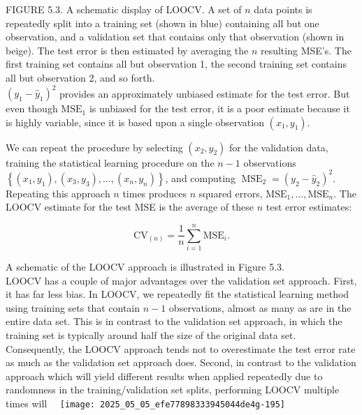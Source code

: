 \documentclass[10pt]{article}
\begin{document}
FIGURE 5.3. A schematic display of LOOCV. A set of $n$ data points is repeatedly split into a training set (shown in blue) containing all but one observation, and a validation set that contains only that observation (shown in beige). The test error is then estimated by averaging the $n$ resulting MSE's. The first training set contains all but observation 1, the second training set contains all but observation 2, and so forth.\\
$\left(y_{1}-\hat{y}_{1}\right)^{2}$ provides an approximately unbiased estimate for the test error. But even though $\mathrm{MSE}_{1}$ is unbiased for the test error, it is a poor estimate because it is highly variable, since it is based upon a single observation $\left(x_{1}, y_{1}\right)$.

We can repeat the procedure by selecting $\left(x_{2}, y_{2}\right)$ for the validation data, training the statistical learning procedure on the $n-1$ observations $\left\{\left(x_{1}, y_{1}\right),\left(x_{3}, y_{3}\right), \ldots,\left(x_{n}, y_{n}\right)\right\}$, and computing $\operatorname{MSE}_{2}=\left(y_{2}-\hat{y}_{2}\right)^{2}$. Repeating this approach $n$ times produces $n$ squared errors, $\mathrm{MSE}_{1}, \ldots, \mathrm{MSE}_{n}$. The LOOCV estimate for the test MSE is the average of these $n$ test error estimates:


\begin{equation*}
\mathrm{CV}_{(n)}=\frac{1}{n} \sum_{i=1}^{n} \mathrm{MSE}_{i} . \tag{5.1}
\end{equation*}


A schematic of the LOOCV approach is illustrated in Figure 5.3.\\
LOOCV has a couple of major advantages over the validation set approach. First, it has far less bias. In LOOCV, we repeatedly fit the statistical learning method using training sets that contain $n-1$ observations, almost as many as are in the entire data set. This is in contrast to the validation set approach, in which the training set is typically around half the size of the original data set. Consequently, the LOOCV approach tends not to overestimate the test error rate as much as the validation set approach does. Second, in contrast to the validation approach which will yield different results when applied repeatedly due to randomness in the training/validation set splits, performing LOOCV multiple times will\
\
\texttt{[image: 2025\_05\_05\_efe77898333945044de4g-195]}
\end{document}
